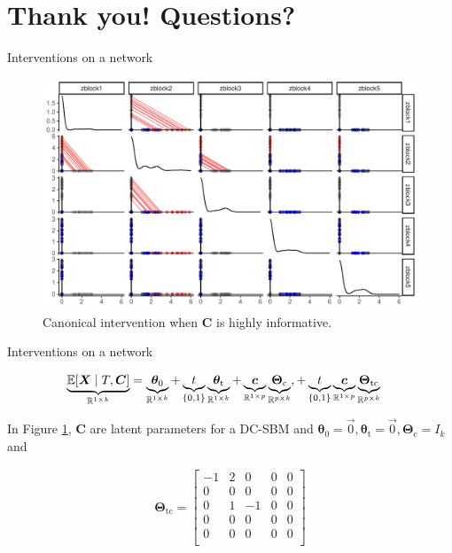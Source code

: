 \documentclass{beamer}
\theoremstyle{remark}
\renewcommand{\c}{\bm c}
\newcommand{\C}{\bm C}
\newcommand{\X}{\bm X}
\newcommand{\thetazero}{\bm \theta_0}
\newcommand{\thetat}{\bm \theta_\text{t}}
\newcommand{\Thetac}{\bm \Theta_\text{c}}
\newcommand{\Thetatc}{\bm \Theta_\text{tc}}
\DeclarePairedDelimiter{\brac}{[}{]}
\newcommand{\E}[2][]{%
   \ifthenelse{ \equal{#1}{} }
      {\ensuremath{\mathbb{E} \brac*{#2}}}
      {\ensuremath{\mathbb{E} \brac*{#2 \mid #1}}}
}
\begin{document}
\section{Thank you! Questions?}

\begin{frame}{Interventions on a network}

    \begin{figure}
        \includegraphics[width=\textwidth]{figures/intervention.pdf}
        \caption{Canonical intervention when $\C$ is highly informative.}
        \label{fig:intervention}
    \end{figure}
\end{frame}

\begin{frame}{Interventions on a network}

    \begin{align*}
        \underbrace{\E[T, \C]{\X}}_{\mathbb R^{1 \times k}}
         & = \underbrace{\thetazero}_{\mathbb R^{1 \times k}}
        + \underbrace{t}_{\{0, 1\}} \underbrace{\thetat}_{\mathbb R^{1 \times k}}
        + \underbrace{\c}_{\mathbb R^{1 \times p}} \underbrace{\Thetac}_{\mathbb R^{p \times k}},
        + \underbrace{t}_{\{0, 1\}} \underbrace{\c}_{\mathbb R^{1 \times p}} \underbrace{\Thetatc}_{\mathbb R^{p \times k}}
    \end{align*}

    In Figure \ref{fig:intervention}, $\C$ are latent parameters for a DC-SBM and $\thetazero = \vec 0, \thetat = \vec 0, \Thetac = I_k$ and

    \begin{align*}
        \Thetatc =
        \begin{bmatrix}
            -1 & 2 & 0  & 0 & 0 \\
            0  & 0 & 0  & 0 & 0 \\
            0  & 1 & -1 & 0 & 0 \\
            0  & 0 & 0  & 0 & 0 \\
            0  & 0 & 0  & 0 & 0 \\
        \end{bmatrix}
    \end{align*}
\end{frame}
\end{document}
